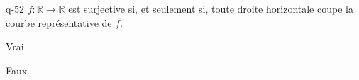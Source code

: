 \begin{truefalse}{q-52}
$f:\mathbb{R}\to \mathbb{R}$ est surjective si, et seulement si, toute droite horizontale coupe la courbe représentative de $f$.
\item* Vrai
\item Faux
\end{truefalse}

